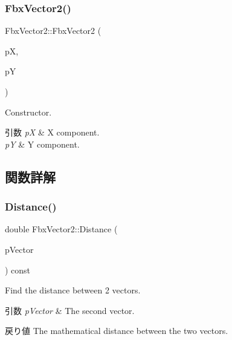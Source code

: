 \subsubsection{\texorpdfstring{Fbx\+Vector2()}{FbxVector2()}\hspace{0.1cm}{\footnotesize\ttfamily [3/3]}}
{\footnotesize\ttfamily Fbx\+Vector2\+::\+Fbx\+Vector2 (\begin{DoxyParamCaption}\item[{double}]{pX,  }\item[{double}]{pY }\end{DoxyParamCaption})}

Constructor. 
\begin{DoxyParams}{引数}
{\em pX} & X component. \\
\hline
{\em pY} & Y component. \\
\hline
\end{DoxyParams}


\subsection{関数詳解}
\mbox{\label{class_fbx_vector2_a95b732ce313c7afc59b5e7f4f804a955}} 
\subsubsection{\texorpdfstring{Distance()}{Distance()}}
{\footnotesize\ttfamily double Fbx\+Vector2\+::\+Distance (\begin{DoxyParamCaption}\item[{const \hyperlink{class_fbx_vector2}{Fbx\+Vector2} \&}]{p\+Vector }\end{DoxyParamCaption}) const}

Find the distance between 2 vectors. 
\begin{DoxyParams}{引数}
{\em p\+Vector} & The second vector. \\
\hline
\end{DoxyParams}
\begin{DoxyReturn}{戻り値}
The mathematical distance between the two vectors. 
\end{DoxyReturn}
\mbox{\label{class_fbx_vector2_a78b87568a55f7cf9f38694367e640fae}} 
